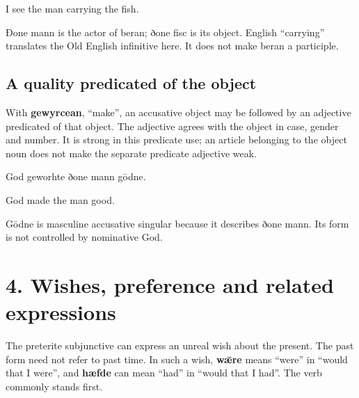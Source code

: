 I see the man carrying the fish.

Ðone mann is the actor of beran; ðone fisc is its object. English “carrying” translates the Old English infinitive here. It does not make beran a participle.

\subsection*{A quality predicated of the object}

With \textbf{gewyrcean}, “make”, an accusative object may be followed by an adjective predicated of that object. The adjective agrees with the object in case, gender and number. It is strong in this predicate use; an article belonging to the object noun does not make the separate predicate adjective weak.

God geworhte ðone mann gōdne.

God made the man good.

Gōdne is masculine accusative singular because it describes ðone mann. Its form is not controlled by nominative God.

\section*{4. Wishes, preference and related expressions}

The preterite subjunctive can express an unreal wish about the present. The past form need not refer to past time. In such a wish, \textbf{wǣre} means “were” in “would that I were”, and \textbf{hæfde} can mean “had” in “would that I had”. The verb commonly stands first.

